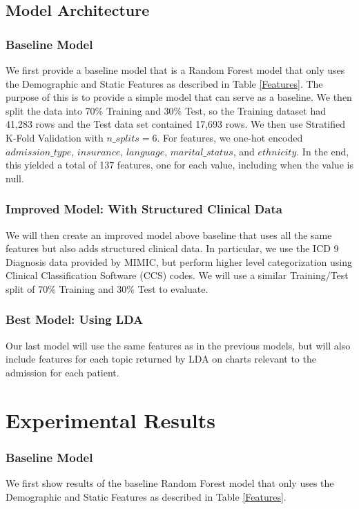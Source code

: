 \documentclass[12pt, final]{article}
\begin{document}
\subsection{Model Architecture}
\label{Model Architecture}

\subsubsection{Baseline Model}
We first provide a baseline model that is a Random Forest model that only uses the Demographic and Static Features as described in Table \ref{Features}. The purpose of this is to provide a simple model that can serve as a baseline. We then split the data into 70\% Training and 30\% Test, so the Training dataset had 41,283 rows and the Test data set contained 17,693 rows. We then use Stratified K-Fold Validation with $n\_splits = 6$. For features, we one-hot encoded $admission\_type$, $insurance$, $language$, $marital\_status$, and $ethnicity$. In the end, this yielded a total of 137 features, one for each value, including when the value is null.

\subsubsection{Improved Model: With Structured Clinical Data}
We will then create an improved model above baseline that uses all the same features but also adds structured clinical data. In particular, we use the ICD 9 Diagnosis data provided by MIMIC, but perform higher level categorization using Clinical Classification Software (CCS) codes. We will use a similar Training/Test split of 70\% Training and 30\% Test to evaluate.

\subsubsection{Best Model: Using LDA}
Our last model will use the same features as in the previous models, but will also include features for each topic returned by LDA on charts relevant to the admission for each patient.

\section{Experimental Results}
\label{Experimental Results}

\subsubsection{Baseline Model}
We first show results of the baseline Random Forest model that only uses the Demographic and Static Features as described in Table \ref{Features}.
\end{document}
